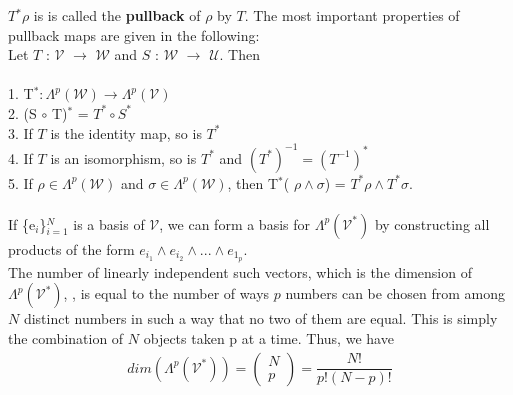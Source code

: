 \documentclass[12pt,a4paper]{article}
\begin{document}
$T$$^*\rho$ is is called the \textbf{pullback } of $\rho$ by $T$. The most important properties of
pullback maps are given in the following:\\
Let $T$ : $\mathcal{V}$ $\to$ $\mathcal{W}$ and  $S$ : $\mathcal{W}$ $\to$ $\mathcal{U}$. Then\\
\\
1. T$^* : \Lambda^{p} (\mathcal{W}) \to \Lambda^{p} (\mathcal{V})$\\
2. (S $\circ$ T)$^*$ = $T^* \circ S^*$\\
3. If $T$ is the identity map, so is $T^*$\\
4. If $T$ is an isomorphism, so is $T^*$ and $(T^*)^{-1} = (T^{-1})^*$\\
5. If $\rho \in \Lambda^{p} (\mathcal{W})$ and $\sigma \in \Lambda^{p} (\mathcal{W})$, then T$^*$( $\rho \wedge \sigma $) = $T^* \rho \wedge T^* \sigma$.
\\ \\
If \{e$_i$\}$^N_{i=1}$ is a basis of $\mathcal{V}$, we can form a basis for $\Lambda^{p}(\mathcal{V}^*)$ by constructing all products of the form $e_{i_1} \wedge e_{i_2} \wedge ... \wedge e_{1_p}$.  \\The number of linearly independent such vectors, which is the dimension of  $\Lambda^{p}(\mathcal{V}^*)$,  , is equal to the number
of ways $p$ numbers can be chosen from among $N$ distinct numbers in such
a way that no two of them are equal. This is simply the combination of $N$
objects taken p at a time. Thus, we have \\
\begin{align*}
 dim (\Lambda^{p}(\mathcal{V}^*)) =  
 \begin{pmatrix} N \\ p \end{pmatrix}
  = \dfrac{N!}{p!(N - p)!}
\end{align*}
\end{document}
